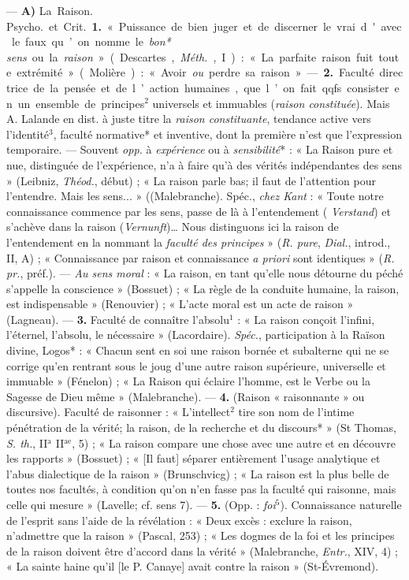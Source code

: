 \begin{itemize}[leftmargin=1cm, label=, itemsep=1pt]
 — {\bf A)} \si{La Raison}.  \si{Psycho.} et
\si{Crit.} {\bf 1.} « Puissance de bien juger et de discerner le vrai d'avec
le faux... qu’on nomme le {\it bon* sens} ou la {\it raison} » (Descartes,
{\it Méth.}, I) : « La parfaite raison fuit toute extrémité » (Molière): «
Avoir {\it ou} perdre sa raison ». — {\bf 2.} Faculté directrice de la pensée
et de l’action humaines, que l’on fait qqfs. consister en un ensemble de
principes$^2$ universels et immuables ({\it raison constituée}). Mais A.
Lalande en dist. à juste titre la {\it raison constituante}, tendance active
vers l'identité$^3$, faculté normative* et inventive, dont la première n’est
que l'expression temporaire. — Souvent {\it opp.} à {\it expérience} ou à {\it
sensibilité}* : « La Raison pure et nue, distinguée de l'expérience, n’a à
faire qu'à des vérités indépendantes des sens » (Leibniz, {\it Théod.},
début) ; « La raison parle bas; il faut de l'attention pour l’entendre. Mais
les sens... » ((Malebranche). Spéc., {\it chez Kant} : « Toute notre
connaissance commence par les sens, passe de là à l’entendement ({\it
Verstand}) et s’achève dans la raison ({\it Vernunft})… Nous distinguons ici
la raison de l’entendement en la nommant la {\it faculté des principes}
» ({\it R. pure}, {\it Dial.}, introd., II, A) ; « Connaissance par raison et
connaissance {\it a priori} sont identiques » ({\it R. pr.}, préf.). — {\it
Au sens moral} : « La raison, en tant qu’elle nous détourne du péché
s'appelle la conscience » (Bossuet) ; « La règle de la conduite humaine, la
raison, est indispensable » (Renouvier) ; « L'acte moral est un acte de
raison » (Lagneau). — {\bf 3.} Faculté de connaître l'absolu$^1$ : « La
raison conçoit l'infini, l'éternel, l'absolu, le nécessaire » (Lacordaire).
{\it Spéc.}, participation à la Raïson divine, Logos* : « Chacun sent en soi
une raison bornée et subalterne qui ne se corrige qu'en rentrant sous le joug
d’une autre raison supérieure, universelle et immuable » (Fénelon) ; « La
Raison qui éclaire l’homme, est le Verbe ou la Sagesse de Dieu même
» (Malebranche). — {\bf 4.} (Raison « raisonnante » ou discursive). Faculté
de raisonner : « L’intellect$^2$ tire son nom de l’intime pénétration de la
vérité; la raison, de la recherche et du discours* » (St Thomas, {\it S.
th.}, II$^\text{a}$ II$^\text{ae}$, 5) ; « La raison compare une chose avec
une autre et en découvre les rapports » (Bossuet) ; « [Il faut] séparer
entièrement l’usage analytique et l’abus dialectique de la raison
» (Brunschvicg) ; « La raison est la plus belle de toutes nos facultés, à
condition qu’on n’en fasse pas la faculté qui raisonne, mais celle qui mesure
» (Lavelle; cf. sens 7). — {\bf 5.} (Opp. : {\it foi}$^5$). Connaissance
naturelle de l’esprit sans l’aide de la révélation : « Deux excès : exclure
la raison, n’admettre que la raison » (Pascal, 253) ; « Les dogmes de la foi
et les principes de la raison doivent être d'accord dans la vérité
» (Malebranche, {\it Entr.}, XIV, 4) ; « La sainte haine qu’il [le P. Canaye]
avait contre la raison » (St-Évremond).


\end{itemize}
